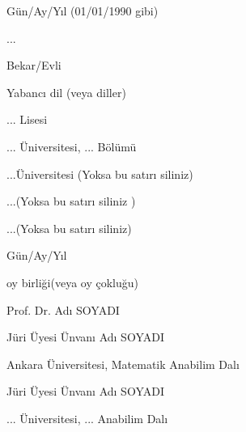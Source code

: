 \documentclass[12pt,a4paper,turkish]{book}
\begin{document}
\begin{dogumtarihi}
Gün/Ay/Yıl (01/01/1990 gibi)
\end{dogumtarihi}

\begin{dogumyeri}
...
\end{dogumyeri}

\begin{medenidurumu}
Bekar/Evli
\end{medenidurumu}

\begin{yabancidil}
Yabancı dil (veya diller)
\end{yabancidil}

\begin{lise}
... Lisesi
\end{lise}

\begin{lisans}
... Üniversitesi, ... Bölümü
\end{lisans}

\begin{yl}
...Üniversitesi (Yoksa bu satırı siliniz)
\end{yl}

\begin{kurum}
...(Yoksa bu satırı siliniz )
\end{kurum}

\begin{yayinlar}
...(Yoksa bu satırı siliniz)
\end{yayinlar}

\begin{tarih}
Gün/Ay/Yıl
\end{tarih}

\begin{oybircok}
oy birliği(veya oy çokluğu)
\end{oybircok}

\begin{mudur}
Prof. Dr. Adı SOYADI
\end{mudur}

\begin{juria}
Jüri Üyesi Ünvanı Adı SOYADI

\hspace{2cm}Ankara Üniversitesi, Matematik Anabilim Dalı 
\end{juria}

\begin{jurib}
Jüri Üyesi Ünvanı Adı SOYADI

\hspace{2cm}... Üniversitesi, ... Anabilim Dalı 
\end{jurib}
\end{document}
